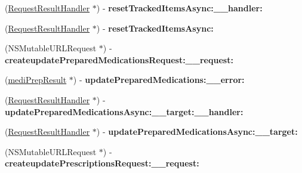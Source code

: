 \begin{DoxyCompactItemize}
\item 
\hypertarget{interface_supply_chain_service_port_binding_ab57a9ccb64d86cfc0852e6a9ae44688e}{}(\hyperlink{interface_request_result_handler}{Request\+Result\+Handler} $\ast$) -\/ {\bfseries reset\+Tracked\+Items\+Async\+:\+\_\+\+\_\+handler\+:}\label{interface_supply_chain_service_port_binding_ab57a9ccb64d86cfc0852e6a9ae44688e}

\item 
\hypertarget{interface_supply_chain_service_port_binding_a8f0d958eb860c1b9a02eaa775fcd0779}{}(\hyperlink{interface_request_result_handler}{Request\+Result\+Handler} $\ast$) -\/ {\bfseries reset\+Tracked\+Items\+Async\+:}\label{interface_supply_chain_service_port_binding_a8f0d958eb860c1b9a02eaa775fcd0779}

\item 
\hypertarget{interface_supply_chain_service_port_binding_ae36a84b6dd7b76a106334425959ea20c}{}(N\+S\+Mutable\+U\+R\+L\+Request $\ast$) -\/ {\bfseries createupdate\+Prepared\+Medications\+Request\+:\+\_\+\+\_\+request\+:}\label{interface_supply_chain_service_port_binding_ae36a84b6dd7b76a106334425959ea20c}

\item 
\hypertarget{interface_supply_chain_service_port_binding_adabb0fb6a3dfcfc6b0bc647385c9d6e0}{}(\hyperlink{interfacemedi_prep_result}{medi\+Prep\+Result} $\ast$) -\/ {\bfseries update\+Prepared\+Medications\+:\+\_\+\+\_\+error\+:}\label{interface_supply_chain_service_port_binding_adabb0fb6a3dfcfc6b0bc647385c9d6e0}

\item 
\hypertarget{interface_supply_chain_service_port_binding_ac857db8240e6bdb2ff913eb0ff9a27c1}{}(\hyperlink{interface_request_result_handler}{Request\+Result\+Handler} $\ast$) -\/ {\bfseries update\+Prepared\+Medications\+Async\+:\+\_\+\+\_\+target\+:\+\_\+\+\_\+handler\+:}\label{interface_supply_chain_service_port_binding_ac857db8240e6bdb2ff913eb0ff9a27c1}

\item 
\hypertarget{interface_supply_chain_service_port_binding_ab661eca4dbc9246df2651b79f6467153}{}(\hyperlink{interface_request_result_handler}{Request\+Result\+Handler} $\ast$) -\/ {\bfseries update\+Prepared\+Medications\+Async\+:\+\_\+\+\_\+target\+:}\label{interface_supply_chain_service_port_binding_ab661eca4dbc9246df2651b79f6467153}

\item 
\hypertarget{interface_supply_chain_service_port_binding_a2ba4749ab527d78725be440e040c040b}{}(N\+S\+Mutable\+U\+R\+L\+Request $\ast$) -\/ {\bfseries createupdate\+Prescriptions\+Request\+:\+\_\+\+\_\+request\+:}\label{interface_supply_chain_service_port_binding_a2ba4749ab527d78725be440e040c040b}


\end{DoxyCompactItemize}
